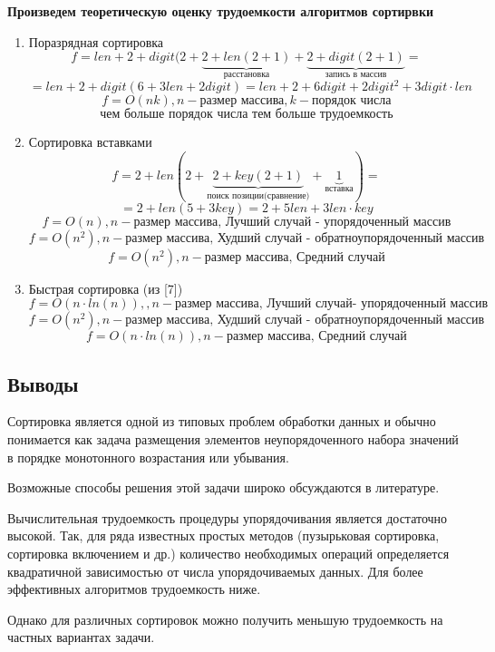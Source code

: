 \documentclass[a4paper,14pt]{article} %
\begin{document}
	\hfill
	
	\textbf{Произведем теоретическую оценку трудоемкости алгоритмов сортирвки}
	\begin{enumerate}
		\item Поразрядная сортировка 
		$$f=len + 2 + digit(2 +\underbrace{2 + len(2+1)}_{\text{расстановка}} + \underbrace{2 +digit(2+1)}_{\text{запись в массив}}=$$
		$$ = len+2 +digit(6+3len+2digit)=len+2+6digit+2digit^2+3digit\cdot len$$
		$$f = O(nk), n - \text{размер массива}, k- \text{порядок числа}$$
		$$\textbf{чем больше порядок числа тем больше трудоемкость}$$
		
		\item Сортировка вставками
		$$f=2+len(2+\underbrace{2+key(2+1)}_{\text{поиск позиции(сравнение)}}+\underbrace{1}_{\text{вставка}})=$$
		$$=2+len(5+3key)=2+5len+3len\cdot key$$
		$$f=O(n), n -\text{размер массива, }\textbf{Лучший случай - упорядоченный массив}$$
		$$f=O(n^2), n -\text{размер массива, }\textbf{Худший случай - обратноупорядоченный массив}$$
		$$f=O(n^2), n -\text{размер массива, }\textbf{Средний случай}$$
		
		\item Быстрая сортировка (из [7])
		$$f=O(n \cdot ln(n)),, n -\text{размер массива, }\textbf{Лучший случай- упорядоченный массив}$$
		$$f=O(n^2), n -\text{размер массива, }\textbf{Худший случай - обратноупорядоченный массив}$$
		$$f=O(n \cdot ln(n)), n -\text{размер массива, }\textbf{Средний случай}$$
	\end{enumerate}
	
       	\subsection{Выводы}
	\hfill
	
	Сортировка является одной из типовых проблем обработки данных и обычно понимается как задача размещения элементов неупорядоченного набора значений в порядке монотонного возрастания или убывания.
	
	Возможные способы решения этой задачи широко обсуждаются в литературе.
	
	Вычислительная трудоемкость процедуры упорядочивания является достаточно высокой. Так, для ряда известных простых методов (пузырьковая сортировка, сортировка включением и др.) количество необходимых операций определяется квадратичной зависимостью от числа упорядочиваемых данных. Для более эффективных алгоритмов трудоемкость ниже. 
	
	Однако для различных сортировок можно получить меньшую трудоемкость на частных вариантах задачи.
	
\end{document}

